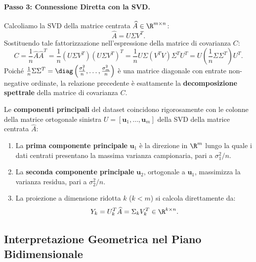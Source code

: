 \paragraph{Passo 3: Connessione Diretta con la SVD.}
Calcoliamo la SVD della matrice centrata $\widehat{A} \in \R^{m \times n}$:
\begin{equation}
    \widehat{A} = U \Sigma V^T.
\end{equation}
Sostituendo tale fattorizzazione nell'espressione della matrice di covarianza $C$:
\begin{equation}
    C = \frac{1}{n} \widehat{A} \widehat{A}^T = \frac{1}{n} (U \Sigma V^T) (U \Sigma V^T)^T = \frac{1}{n} U \Sigma (V^T V) \Sigma^T U^T = U \left( \frac{1}{n} \Sigma \Sigma^T \right) U^T.
\end{equation}
Poich\'e $\frac{1}{n} \Sigma \Sigma^T = \diag\left( \frac{\sigma_1^2}{n}, \dots, \frac{\sigma_m^2}{n} \right)$ \`e una matrice diagonale con entrate non-negative ordinate, la relazione precedente \`e esattamente la \textbf{decomposizione spettrale} della matrice di covarianza $C$.

\begin{theorem}
Le \textbf{componenti principali} del dataset coincidono rigorosamente con le colonne della matrice ortogonale sinistra $U = [\mathbf{u}_1, \dots, \mathbf{u}_m]$ della SVD della matrice centrata $\widehat{A}$:
\begin{enumerate}
    \item La \textbf{prima componente principale} $\mathbf{u}_1$ \`e la direzione in $\R^m$ lungo la quale i dati centrati presentano la massima varianza campionaria, pari a $\sigma_1^2 / n$.
    \item La \textbf{seconda componente principale} $\mathbf{u}_2$, ortogonale a $\mathbf{u}_1$, massimizza la varianza residua, pari a $\sigma_2^2 / n$.
    \item La proiezione a dimensione ridotta $k$ ($k < m$) si calcola direttamente da:
    \begin{equation}
        Y_k = U_k^T \widehat{A} = \Sigma_k V_k^T \in \R^{k \times n}.
    \end{equation}
\end{enumerate}
\end{theorem}

\subsection{Interpretazione Geometrica nel Piano Bidimensionale}

